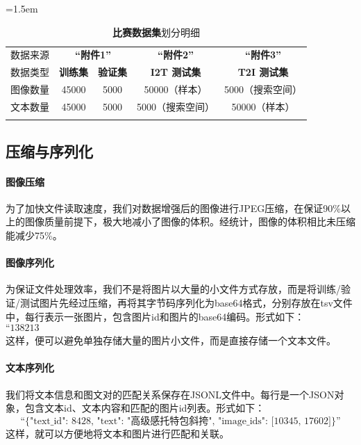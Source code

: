 \documentclass[a4paper]{zreport}
\begin{document}
\begin{table}[h]
\centering
\tabcolsep=1.5em
\renewcommand\arraystretch{1.5}
\caption{\textbf{比赛数据集}划分明细}
\vspace{1em}
\begin{tabular}{c|c|c|c|c}
    \Xhline{2pt}
    数据来源 & \multicolumn{2}{c|}{\textbf{“附件1”}} & \multicolumn{1}{c|}{\textbf{“附件2”}} & 
    \multicolumn{1}{c}{\textbf{“附件3”}}\\
    
    \Xhline{1.5pt}

    数据类型 & \textbf{训练集} & \textbf{验证集} & \textbf{I2T 测试集} & \textbf{T2I 测试集} \\
    \Xhline{0.4pt}
    图像数量 & {45000} & {5000} & {50000（样本）} & {5000（搜索空间）} \\
    \Xhline{0.4pt}
    文本数量 & {45000} & {5000} & {5000（搜索空间）} & {50000（样本）} \\

    \Xhline{2pt}
\end{tabular} \label{tbl:DataSplit}
\end{table}

\subsection{压缩与序列化}

\paragraph{图像压缩}
为了加快文件读取速度，我们对数据增强后的图像进行JPEG压缩，在保证90\%以上的图像质量前提下，极大地减小了图像的体积。经统计，图像的体积相比未压缩能减少75\%。

\paragraph{图像序列化}
为保证文件处理效率，我们不是将图片以大量的小文件方式存放，而是将训练/验证/测试图片先经过压缩，再将其字节码序列化为base64格式，分别存放在tsv文件中，每行表示一张图片，包含图片id和图片的base64编码。形式如下：$$\text{“138213	/9j/4AAQSkZJRgABAQAAAQABAAD/2wBDAAgGBgcGBQgHBwcJCQgKDBQ”}$$
这样，便可以避免单独存储大量的图片小文件，而是直接存储一个文本文件。

\paragraph{文本序列化}
我们将文本信息和图文对的匹配关系保存在JSONL文件中。每行是一个JSON对象，包含文本id、文本内容和匹配的图片id列表。形式如下：
$$\text{“\{"text\_id": 8428, "text": "高级感托特包斜挎", "image\_ids": [10345, 17602]\}”}$$
这样，就可以方便地将文本和图片进行匹配和关联。
\end{document}
